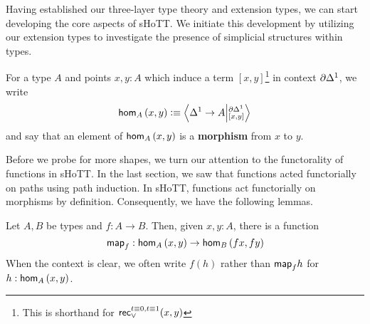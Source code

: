 \documentclass[main.tex]{subfiles}
\begin{document}
Having established our three-layer type theory and extension types, we can start developing the core aspects of sHoTT. We initiate this development by utilizing our extension types to investigate the presence of simplicial structures within types.

\begin{definition}
    For a type $A$ and points $x,y : A$ which induce a term $[x,y]$\footnote{This is shorthand for $\recOr{t \equiv 0, t \equiv 1}{x}{y}$} in context $\pardo$, we write
    $$\ho[A]{x}{y} \defeq \ndexten{\osx}{A}{\pardo}{[x,y]}$$
    and say that an element of $\ho[A]{x}{y}$ is a \textbf{morphism} from $x$ to $y$. 
\end{definition}

Before we probe for more shapes, we turn our attention to the functorality of functions in sHoTT. In the last section, we saw that functions acted functorially on paths using path induction. In sHoTT, functions act functorially on morphisms by definition.
Consequently, we have the following lemmas.
\begin{lemma}
    \label{lem:mapfunc}
    Let $A,B$ be types and $f : A \to B$. Then, given $x,y : A$, there is a function 
    \[\mapfunc{f} : \ho[A]{x}{y} \to \ho[B]{f x}{f y}\]
    When the context is clear, we often write $f(h)$ rather than $\mapfunc{f}h$ for $h : \ho[A]{x}{y}$.
\end{lemma}
\end{document}
